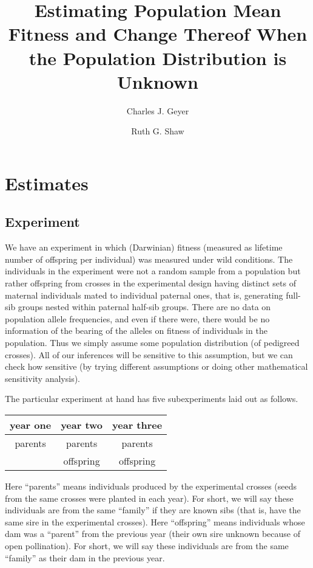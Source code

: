 \documentclass[11pt]{article}
\begin{document}
\title{Estimating Population Mean Fitness and Change Thereof When
    the Population Distribution is Unknown}

\author{Charles J. Geyer \and Ruth G. Shaw}

\maketitle

\section{Estimates}

\subsection{Experiment}

We have an experiment in which (Darwinian) fitness (measured as lifetime
number of offspring per individual) was measured under wild conditions.
The individuals in the experiment were not a random sample from
a population but rather offspring from crosses in the experimental design having distinct sets of maternal
individuals mated to individual paternal ones, that is,
generating full-sib groups nested within paternal half-sib
groups.  There are no data on
population allele frequencies, and even if there were, there would be
no information of the bearing of the alleles on fitness of individuals in the population. 
Thus we simply assume some population distribution (of
pedigreed crosses).  All of our inferences will be sensitive to this
assumption, but we can check how sensitive (by trying different assumptions
or doing other mathematical sensitivity analysis).

The particular experiment at hand has five subexperiments laid out as follows.
\begin{center}
\begin{tabular}{ccc}
year one & year two & year three \\
\hline
parents & parents & parents \\
        & offspring & offspring
\end{tabular}
\end{center}
Here ``parents'' means individuals produced by the experimental crosses (seeds from
the same crosses were planted in each year).  For short, we will say these
individuals are from the same ``family'' if they are known sibs
(that is, have the same sire in the experimental crosses).
Here ``offspring'' means individuals whose dam was a ``parent'' from the
previous year (their own sire unknown because of open pollination).
For short, we will say these
individuals are from the same ``family'' as their dam in the previous year.
\end{document}
